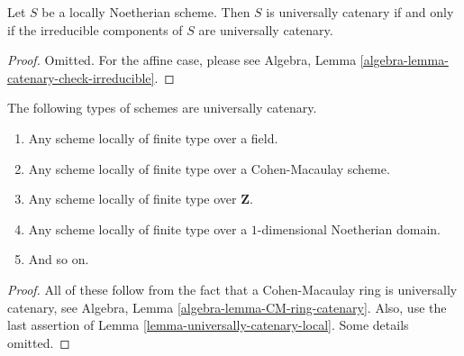 \begin{lemma}
\label{lemma-catenary-check-irreducible}
Let $S$ be a locally Noetherian scheme. Then $S$ is universally catenary
if and only if the irreducible components of $S$ are universally catenary.
\end{lemma}

\begin{proof}
Omitted. For the affine case, please see
Algebra, Lemma \ref{algebra-lemma-catenary-check-irreducible}.
\end{proof}

\begin{lemma}
\label{lemma-ubiquity-uc}
The following types of schemes are universally catenary.
\begin{enumerate}
\item Any scheme locally of finite type over a field.
\item Any scheme locally of finite type over a Cohen-Macaulay scheme.
\item Any scheme locally of finite type over $\mathbf{Z}$.
\item Any scheme locally of finite type over a $1$-dimensional
Noetherian domain.
\item And so on.
\end{enumerate}
\end{lemma}

\begin{proof}
All of these follow from the fact that a
Cohen-Macaulay ring is universally catenary, see
Algebra, Lemma \ref{algebra-lemma-CM-ring-catenary}.
Also, use the last assertion of
Lemma \ref{lemma-universally-catenary-local}.
Some details omitted.
\end{proof}























